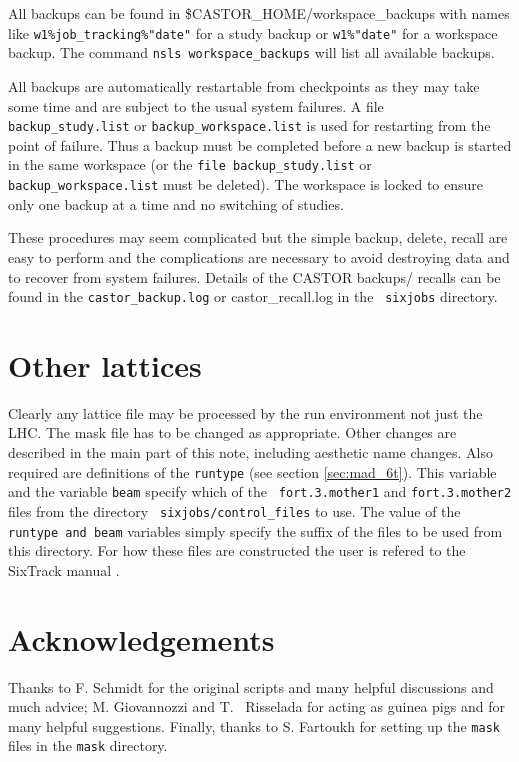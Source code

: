 \documentclass{cernatsnote}
\begin{document}
All backups can be found in \$CASTOR\_HOME/workspace\_backups with names like
\texttt{w1\%job\_tracking\%"date"} for a study backup or \texttt{w1\%"date"} for a
workspace backup.  The command \texttt{nsls workspace\_backups} will list all
available backups.

All backups are automatically restartable from checkpoints as they may take
some time and are subject to the usual system failures. A file {\tt
backup\_study.list} or \texttt{backup\_workspace.list} is used for restarting from
the point of failure. Thus a backup must be completed before a new backup is
started in the same workspace (or the \texttt{file backup\_study.list} or {\tt
backup\_workspace.list} must be deleted). The workspace is locked to ensure
only one backup at a time and no switching of studies.

These procedures may seem complicated but the simple backup, delete, recall are
easy to perform and the complications are necessary to avoid destroying data
and to recover from system failures. Details of the CASTOR backups/ recalls can
be found in the \texttt{castor\_backup.log} or {castor\_recall.log} in the {\tt
sixjobs} directory.

\section{Other lattices}
\label{sec:otherlattices}

Clearly any lattice file may be processed by the run environment not just the
LHC. The mask file has to be changed as appropriate.  Other changes are
described in the main part of this note, including aesthetic name changes. Also
required are definitions of the \texttt{runtype} (see section \ref{sec:mad_6t}).
This variable and the variable \texttt{beam} specify which of the {\tt
fort.3.mother1} and \texttt{fort.3.mother2} files from the directory {\tt
sixjobs/control\_files} to use. The value of the \texttt{runtype and beam}
variables simply specify the suffix of the files to be used from this
directory. For how these files are constructed the user is refered to the
SixTrack manual \cite{SixTrack}.

\section{Acknowledgements}
Thanks to F. Schmidt for the original scripts and many helpful discussions and
much advice; M. Giovannozzi and T. ~Risselada for acting as guinea pigs and for
many helpful suggestions.  Finally, thanks to S. Fartoukh for setting up the
\texttt{mask} files in the \texttt{mask} directory.
\end{document}
